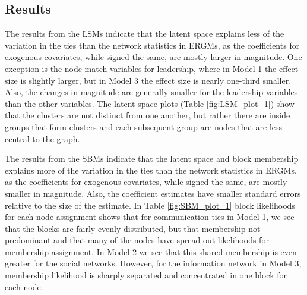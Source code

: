 \documentclass[fleqn,12pt]{wlscirep}
\begin{document}
\subsection{Results}



The results from the LSMs indicate that the latent space explains less of the variation in the ties than the network statistics in ERGMs, as the coefficients for exogenous covariates, while signed the same, are mostly larger in magnitude. One exception is the node-match variables for leadership, where in Model 1 the effect size is slightly larger, but in Model 3 the effect size is nearly one-third smaller. Also, the changes in magnitude are generally smaller for the leadership variables than the other variables. The latent space plots (Table \ref{fig:LSM_plot_1}) show that the clusters are not distinct from one another, but rather there are inside groups that form clusters and each subsequent group are nodes that are less central to the graph.

The results from the SBMs indicate that the latent space and block membership explains more of the variation in the ties than the network statistics in ERGMs, as the coefficients for exogenous covariates, while signed the same, are mostly smaller in magnitude. Also, the coefficient estimates have smaller standard errors relative to the size of the estimate. In Table \ref{fig:SBM_plot_1} block likelihoods for each node assignment shows that for communication ties in Model 1, we see that the blocks are fairly evenly distributed, but that membership not predominant and that many of the nodes have spread out likelihoods for membership assignment. In Model 2 we see that this shared membership is even greater for the social networks. However, for the information network in Model 3, membership likelihood is sharply separated and concentrated in one block for each node.
\end{document}
